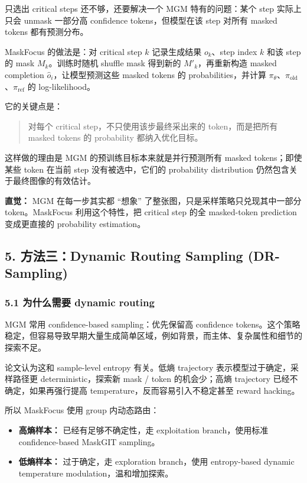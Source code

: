 只选出 critical steps 还不够，还要解决一个 MGM 特有的问题：某个 step 实际上只会 unmask 一部分高 confidence tokens，但模型在该 step 对所有 masked tokens 都有预测分布。

MaskFocus 的做法是：对 critical step \(k\) 记录生成结果 \(o_k\)、step index \(k\) 和该 step 的 mask \(M_k\)。训练时随机 shuffle mask 得到新的 \(M'_k\)，再重新构造 masked completion \(\hat{o}_i\)，让模型预测这些 masked tokens 的 probabilities，并计算 \(\pi_\theta\)、\(\pi_{\mathrm{old}}\)、\(\pi_{\mathrm{ref}}\) 的 log-likelihood。

它的关键点是：

\begin{quote}
对每个 critical step，不只使用该步最终采出来的 token，而是把所有 masked tokens 的 probability 都纳入优化目标。
\end{quote}

这样做的理由是 MGM 的预训练目标本来就是并行预测所有 masked tokens；即使某些 token 在当前 step 没有被选中，它们的 probability distribution 仍然包含关于最终图像的有效估计。

\begin{intubox}
\textbf{直觉：} MGM 在每一步其实都 ``想象'' 了整张图，只是采样策略只兑现其中一部分 token。MaskFocus 利用这个特性，把 critical step 的全 masked-token prediction 变成更直接的 probability estimation。
\end{intubox}

\subsection{5. 方法三：Dynamic Routing Sampling (DR-Sampling)}

\subsubsection{5.1 为什么需要 dynamic routing}

MGM 常用 confidence-based sampling：优先保留高 confidence tokens。这个策略稳定，但容易导致早期大量生成简单区域，例如背景，而主体、复杂属性和细节的探索不足。

论文认为这和 sample-level entropy 有关。低熵 trajectory 表示模型过于确定，采样路径更 deterministic，探索新 mask / token 的机会少；高熵 trajectory 已经不确定，如果再强行提高 temperature，反而容易引入不稳定甚至 reward hacking。

所以 MaskFocus 使用 group 内动态路由：

\begin{itemize}[leftmargin=1.5em]
  \item \textbf{高熵样本：} 已经有足够不确定性，走 exploitation branch，使用标准 confidence-based MaskGIT sampling。
  \item \textbf{低熵样本：} 过于确定，走 exploration branch，使用 entropy-based dynamic temperature modulation，温和增加探索。
\end{itemize}

